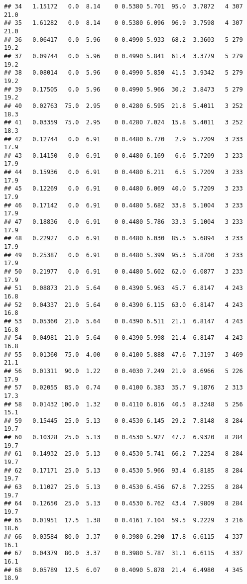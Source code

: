 \documentclass[]{article}
\begin{document}
\begin{verbatim}
## 34   1.15172   0.0  8.14    0 0.5380 5.701  95.0  3.7872   4 307    21.0
## 35   1.61282   0.0  8.14    0 0.5380 6.096  96.9  3.7598   4 307    21.0
## 36   0.06417   0.0  5.96    0 0.4990 5.933  68.2  3.3603   5 279    19.2
## 37   0.09744   0.0  5.96    0 0.4990 5.841  61.4  3.3779   5 279    19.2
## 38   0.08014   0.0  5.96    0 0.4990 5.850  41.5  3.9342   5 279    19.2
## 39   0.17505   0.0  5.96    0 0.4990 5.966  30.2  3.8473   5 279    19.2
## 40   0.02763  75.0  2.95    0 0.4280 6.595  21.8  5.4011   3 252    18.3
## 41   0.03359  75.0  2.95    0 0.4280 7.024  15.8  5.4011   3 252    18.3
## 42   0.12744   0.0  6.91    0 0.4480 6.770   2.9  5.7209   3 233    17.9
## 43   0.14150   0.0  6.91    0 0.4480 6.169   6.6  5.7209   3 233    17.9
## 44   0.15936   0.0  6.91    0 0.4480 6.211   6.5  5.7209   3 233    17.9
## 45   0.12269   0.0  6.91    0 0.4480 6.069  40.0  5.7209   3 233    17.9
## 46   0.17142   0.0  6.91    0 0.4480 5.682  33.8  5.1004   3 233    17.9
## 47   0.18836   0.0  6.91    0 0.4480 5.786  33.3  5.1004   3 233    17.9
## 48   0.22927   0.0  6.91    0 0.4480 6.030  85.5  5.6894   3 233    17.9
## 49   0.25387   0.0  6.91    0 0.4480 5.399  95.3  5.8700   3 233    17.9
## 50   0.21977   0.0  6.91    0 0.4480 5.602  62.0  6.0877   3 233    17.9
## 51   0.08873  21.0  5.64    0 0.4390 5.963  45.7  6.8147   4 243    16.8
## 52   0.04337  21.0  5.64    0 0.4390 6.115  63.0  6.8147   4 243    16.8
## 53   0.05360  21.0  5.64    0 0.4390 6.511  21.1  6.8147   4 243    16.8
## 54   0.04981  21.0  5.64    0 0.4390 5.998  21.4  6.8147   4 243    16.8
## 55   0.01360  75.0  4.00    0 0.4100 5.888  47.6  7.3197   3 469    21.1
## 56   0.01311  90.0  1.22    0 0.4030 7.249  21.9  8.6966   5 226    17.9
## 57   0.02055  85.0  0.74    0 0.4100 6.383  35.7  9.1876   2 313    17.3
## 58   0.01432 100.0  1.32    0 0.4110 6.816  40.5  8.3248   5 256    15.1
## 59   0.15445  25.0  5.13    0 0.4530 6.145  29.2  7.8148   8 284    19.7
## 60   0.10328  25.0  5.13    0 0.4530 5.927  47.2  6.9320   8 284    19.7
## 61   0.14932  25.0  5.13    0 0.4530 5.741  66.2  7.2254   8 284    19.7
## 62   0.17171  25.0  5.13    0 0.4530 5.966  93.4  6.8185   8 284    19.7
## 63   0.11027  25.0  5.13    0 0.4530 6.456  67.8  7.2255   8 284    19.7
## 64   0.12650  25.0  5.13    0 0.4530 6.762  43.4  7.9809   8 284    19.7
## 65   0.01951  17.5  1.38    0 0.4161 7.104  59.5  9.2229   3 216    18.6
## 66   0.03584  80.0  3.37    0 0.3980 6.290  17.8  6.6115   4 337    16.1
## 67   0.04379  80.0  3.37    0 0.3980 5.787  31.1  6.6115   4 337    16.1
## 68   0.05789  12.5  6.07    0 0.4090 5.878  21.4  6.4980   4 345    18.9

\end{verbatim}
\end{document}
